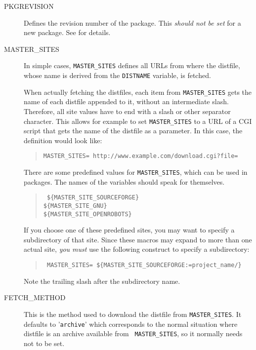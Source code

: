 \begin{description}
   \item[PKGREVISION] Defines the \robotpkg revision number of the package. This
   {\em should not be set} for a new package. See
   for details.

   \smallbreak
   \item[MASTER\_SITES] In simple cases, {\tt MASTER\_SITES}  defines all URLs
   from where the distfile, whose name is derived from the {\tt DISTNAME}
   variable, is fetched.

   When actually fetching the distfiles, each item from {\tt MASTER\_SITES}
   gets the name of each distfile appended to it, without an intermediate
   slash. Therefore, all site values have to end with a slash or other
   separator character. This allows for example to set {\tt MASTER\_SITES} to a
   URL of a CGI script that gets the name of the distfile as a parameter. In
   this case, the definition would look like:
   \begin{quote}
      {\tt MASTER\_SITES=   http://www.example.com/download.cgi?file=}
   \end{quote}

   There are some predefined values for {\tt MASTER\_SITES}, which can be used
   in packages. The names of the variables should speak for themselves.
   \begin{quote}\tt
      \$\{MASTER\_SITE\_SOURCEFORGE\}\\
      \$\{MASTER\_SITE\_GNU\}\\
      \$\{MASTER\_SITE\_OPENROBOTS\}
   \end{quote}

   If you choose one of these predefined sites, you may want to specify a
   subdirectory of that site. Since these macros may expand to more than one
   actual site, {\em you must} use the following construct to specify a
   subdirectory:
   \begin{quote}\tt
      MASTER\_SITES=~\$\{MASTER\_SITE\_SOURCEFORGE:=project\_name/\}
   \end{quote}
   Note the trailing slash after the subdirectory name.

   \smallbreak
   \item[FETCH\_METHOD] This is the method used to download the distfile from
   {\tt MASTER\_SITES}. It defaults to '{\tt archive}' which corresponds to the
   normal situation where distfile is an archive available from {\tt
   MASTER\_SITES}, so it normally needs not to be set.


\end{description}
